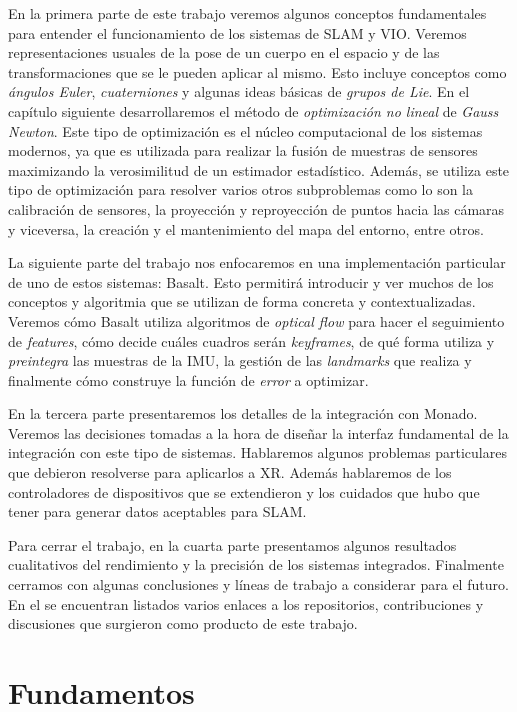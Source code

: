 \documentclass[ twoside,openright,titlepage,numbers=noenddot,%
                headinclude,footinclude,cleardoublepage=empty,abstract=on,
                BCOR=-5mm,paper=a4,fontsize=11pt
                ]{scrreprt}
\begin{document}
En la primera parte de este trabajo veremos algunos conceptos
fundamentales para entender el funcionamiento de los sistemas de SLAM y
VIO. Veremos representaciones usuales de la pose de un cuerpo en el
espacio y de las transformaciones que se le pueden aplicar al mismo.
Esto incluye conceptos como \emph{ángulos Euler}, \emph{cuaterniones} y
algunas ideas básicas de \emph{grupos de Lie}. En el capítulo siguiente
desarrollaremos el método de \emph{optimización no lineal} de
\emph{Gauss Newton}. Este tipo de optimización es el núcleo
computacional de los sistemas modernos, ya que es utilizada para
realizar la fusión de muestras de sensores maximizando la verosimilitud
de un estimador estadístico. Además, se utiliza este tipo de
optimización para resolver varios otros subproblemas como lo son la
calibración de sensores, la proyección y reproyección de puntos hacia
las cámaras y viceversa, la creación y el mantenimiento del mapa del
entorno, entre otros.

La siguiente parte del trabajo nos enfocaremos en una implementación
particular de uno de estos sistemas: Basalt. Esto permitirá introducir y
ver muchos de los conceptos y algoritmia que se utilizan de forma
concreta y contextualizadas. Veremos cómo Basalt utiliza algoritmos de
\emph{optical flow} para hacer el seguimiento de \emph{features}, cómo
decide cuáles cuadros serán \emph{keyframes}, de qué forma utiliza y
\emph{preintegra} las muestras de la IMU, la gestión de las
\emph{landmarks} que realiza y finalmente cómo construye la función de
\emph{error} a optimizar.

En la tercera parte presentaremos los detalles de la integración con
Monado. Veremos las decisiones tomadas a la hora de diseñar la interfaz
fundamental de la integración con este tipo de sistemas. Hablaremos
algunos problemas particulares que debieron resolverse para aplicarlos a
XR. Además hablaremos de los controladores de dispositivos que se
extendieron y los cuidados que hubo que tener para generar datos
aceptables para SLAM.

Para cerrar el trabajo, en la cuarta parte presentamos algunos
resultados cualitativos del rendimiento y la precisión de los sistemas
integrados. Finalmente cerramos con algunas conclusiones y líneas de
trabajo a considerar para el futuro. En el 
se encuentran listados varios enlaces a los repositorios, contribuciones
y discusiones que surgieron como producto de este trabajo.

\hypertarget{fundamentos}{%
\chapter{Fundamentos}\label{fundamentos}}
\end{document}
